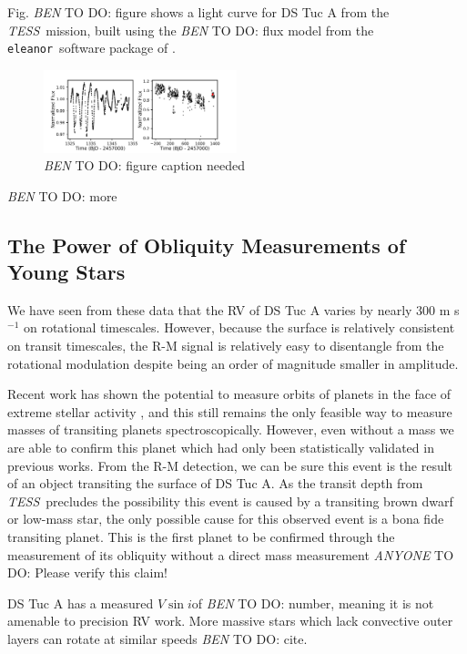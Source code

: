 \documentclass[twocolumn]{aastex62}
\newcommand{\tess}{{\it TESS}}
\newcommand{\vsini}{{$V \sin i$}}
\newcommand{\eleanor}{\texttt{eleanor}}
\newcommand{\todo}[3]{{\color{#2} \emph{#1} TO DO: #3}}
\newcommand{\btmtodo}[1]{\todo{BEN}{blue}{#1}}
\newcommand{\anytodo}[1]{\todo{ANYONE}{green}{#1}}
\begin{document}
Fig. \btmtodo{figure} shows a light curve for DS Tuc A from the \tess\ mission, built using the \btmtodo{flux} model from the \eleanor\ software package of \citet{Feinstein19}.

\begin{figure}[!tbh]
  \begin{center}
    \includegraphics[width=0.5\textwidth, trim={0cm 0.0cm 0cm 0cm}, clip=true]{../figures/lcs.pdf}
   \end{center}
  \caption{\btmtodo{figure caption needed}}
  \label{fig:data}
\end{figure}

\btmtodo{more}


\subsection{The Power of Obliquity Measurements of Young Stars}

We have seen from these data that the RV of DS Tuc A varies by nearly 300 m s$^{-1}$ on rotational timescales. 
However, because the surface is relatively consistent on transit timescales, the R-M signal is relatively easy to disentangle from the rotational modulation despite being an order of magnitude smaller in amplitude.

Recent work has shown the potential to measure orbits of planets in the face of extreme stellar activity \citep{Barragan19}, and this still remains the only feasible way to measure masses of transiting planets spectroscopically. 
However, even without a mass we are able to confirm this planet which had only been statistically validated in previous works. 
From the R-M detection, we can be sure this event is the result of an object transiting the surface of DS Tuc A. 
As the transit depth from \tess\ precludes the possibility this event is caused by a transiting brown dwarf or low-mass star, the only possible cause for this observed event is a bona fide transiting planet.
This is the first planet to be confirmed through the measurement of its obliquity without a direct mass measurement \anytodo{Please verify this claim!}

DS Tuc A has a measured \vsini of \btmtodo{number}, meaning it is not amenable to precision RV work.
More massive stars which lack convective outer layers can rotate at similar speeds \btmtodo{cite}.
\end{document}
